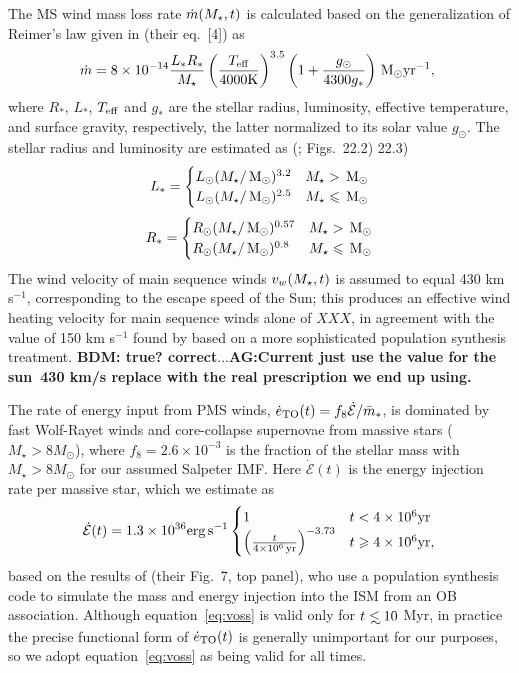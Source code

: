 The MS wind mass loss rate $\dot{m}(M_{\star}, t)$ is calculated based on the generalization of Reimer's law given in \citet{SchroderCuntz:2005a} (their eq.~[4]) as
\begin{align}
  \dot{m}=8 \times 10^{-14} \frac{L_* R_*}{M_{\star}}
  \left(\frac{T_{\rm eff}}{\rm 4000 K}\right)^{3.5}
  \left(1+\frac{g_{\odot}}{4300 g_*}\right) \,{\rm M_\odot} {\rm yr}^{-1},\
\end{align}
where  $R_*$, $L_*$, $T_{\rm eff}$ and $g_*$ are the stellar radius,
luminosity, effective temperature, and surface gravity, respectively, the latter normalized to its solar value $g_{\odot}$.  The stellar radius and luminosity are estimated as (\citet{Kippenhahn&Weigert90}; Figs.~22.2) 22.3)
\begin{align}
L_*=
\begin{cases}
L_{\odot} (M_{\star}/\,{\rm M_\odot})^{3.2} & M_{\star} > \,{\rm M_\odot} \\
L_{\odot} (M_{\star}/\,{\rm M_\odot})^{2.5} & M_{\star} \leqslant \,{\rm M_\odot}
\end{cases}
\end{align}
\begin{align}
R_*=
\begin{cases}
R_{\odot} (M_{\star}/\,{\rm M_\odot})^{0.57} & M_{\star} > \,{\rm M_\odot} \\
R_{\odot} (M_{\star}/\,{\rm M_\odot})^{0.8} & M_{\star} \leqslant \,{\rm M_\odot}
\end{cases}
\end{align}
The wind velocity of main sequence winds $v_w (M_{\star}, t)$ is assumed to equal 430 km s$^{-1}$, corresponding to the escape speed of the Sun; this produces an effective wind heating velocity for main sequence winds alone of $XXX$, in agreement with the value of 150 km s$^{-1}$ found by \citet{NaimanSoares-Furtado+:2013a} based on a more sophisticated population synthesis treatment. {\bf BDM: true? correct}...{\bf AG:Current just use the value for the sun~430 km/s
  replace with the real prescription we end up using.}

The rate of energy input from PMS winds, $\dot{e}_{\rm TO}(t) = f_{8}\dot{\mathcal{E}}/\bar{m}_*$, is dominated by fast Wolf-Rayet winds and core-collapse supernovae from massive stars ($M_{\star} > 8M_{\odot}$), where $f_{8} =2.6 \times 10^{-3}$ is the fraction of the stellar mass with $M_{\star} > 8M_{\odot}$ for our assumed Salpeter IMF.  Here $\dot{\mathcal{E}} (t)$ is the energy injection rate per massive star, which we estimate as
\begin{align}
\dot{\mathcal{E}} (t)=  1.3 \times 10^{36} {\rm erg\,s^{-1}}
\begin{cases}
  1 & t<4 \times 10^6 {\rm yr}\\
  \left(\frac{t}{4 \times  10^6\,{\rm yr}}\right)^{-3.73} & t \ge 4 \times 10^6 {\rm yr},
\end{cases}
\label{eq:voss}
\end{align}
based on the results of \citet{VossDiehl+:2009a} (their Fig.~7, top panel), who use a population synthesis code to simulate the mass and energy injection into the ISM from an OB association.  Although equation~\eqref{eq:voss} is valid only for $t \lsim 10$ Myr, in practice the precise functional form of $\dot{e}_{\rm TO}(t)$ is generally unimportant for our purposes, so we adopt equation~\eqref{eq:voss} as being valid for all times.


